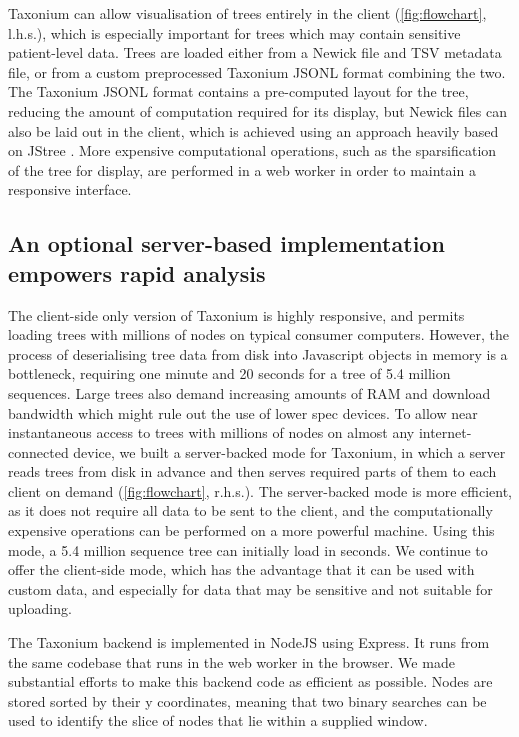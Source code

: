 Taxonium can allow visualisation of trees entirely in the client (\cref{fig:flowchart}, l.h.s.), which is especially important for trees which may contain sensitive patient-level data. Trees are loaded either from a Newick file and TSV metadata file, or from a custom preprocessed Taxonium JSONL format combining the two. The Taxonium JSONL format contains a pre-computed layout for the tree, reducing the amount of computation required for its display, but Newick files can also be laid out in the client, which is achieved using an approach heavily based on JStree \citep{jstree}. More expensive computational operations, such as the sparsification of the tree for display, are performed in a web worker in order to maintain a responsive interface.

\subsection*{An optional server-based implementation empowers rapid analysis}

The client-side only version of Taxonium is highly responsive, and permits loading trees with millions of nodes on typical consumer computers. However, the process of deserialising tree data from disk into Javascript objects in memory is a bottleneck, requiring one minute and 20 seconds for a tree of 5.4 million sequences. Large trees also demand increasing amounts of RAM and download bandwidth which might rule out the use of lower spec devices. To allow near instantaneous access to trees with millions of nodes on almost any internet-connected device, we built a server-backed mode for Taxonium, in which a server reads trees from disk in advance and then serves required parts of them to each client on demand (\cref{fig:flowchart}, r.h.s.). The server-backed mode is more efficient, as it does not require all data to be sent to the client, and the computationally expensive operations can be performed on a more powerful machine. Using this mode, a 5.4 million sequence tree can initially load in seconds. We continue to offer the client-side mode, which has the advantage that it can be used with custom data, and especially for data that may be sensitive and not suitable for uploading.



The Taxonium backend is implemented in NodeJS using Express. It runs from the same codebase that runs in the web worker in the browser. We made substantial efforts to make this backend code as efficient as possible. Nodes are stored sorted by their y coordinates, meaning that two binary searches can be used to identify the slice of nodes that lie within a supplied window.

